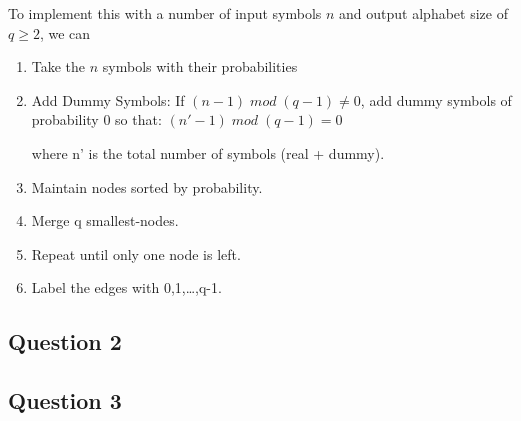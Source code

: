 \documentclass[]{template}
\begin{document}
        \noindent
        To implement this with a number of input symbols $n$ and output alphabet size of $q \geq 2$, we can
        
        \begin{enumerate}
            \item Take the $n$ symbols with their probabilities
            \item Add Dummy Symbols: If $(n-1) \; mod \; (q-1) \neq  0$, add dummy symbols of probability 0 so that:
            $(n' - 1) \; mod \; (q-1)=0$
            
            where n' is the total number of symbols (real + dummy).
            \item Maintain nodes sorted by probability.  
            \item Merge q smallest-nodes.
            \item Repeat until only one node is left.
            \item Label the edges with 0,1,\ldots,q-1.
        \end{enumerate}
        
    \subsection{Question 2}

    \subsection{Question 3}
\end{document}
